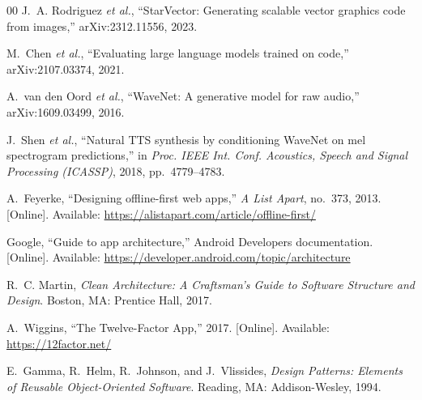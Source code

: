 \documentclass[conference]{IEEEtran}
\begin{document}
\begin{thebibliography}{00}
 J.~A. Rodriguez \emph{et al.}, ``StarVector:
Generating scalable vector graphics code from images,'' arXiv:2312.11556, 2023.

 M.~Chen \emph{et al.}, ``Evaluating large language
models trained on code,'' arXiv:2107.03374, 2021.

 A.~van den Oord \emph{et al.}, ``WaveNet: A generative
model for raw audio,'' arXiv:1609.03499, 2016.

 J.~Shen \emph{et al.}, ``Natural TTS synthesis by
conditioning WaveNet on mel spectrogram predictions,'' in \emph{Proc. IEEE Int.
Conf. Acoustics, Speech and Signal Processing (ICASSP)}, 2018, pp.~4779--4783.

 A.~Feyerke, ``Designing offline-first web apps,'' \emph{A
List Apart}, no.~373, 2013. [Online]. Available:
\url{https://alistapart.com/article/offline-first/}

 Google, ``Guide to app architecture,'' Android Developers
documentation. [Online]. Available:
\url{https://developer.android.com/topic/architecture}

 R.~C. Martin, \emph{Clean Architecture: A Craftsman's
Guide to Software Structure and Design}. Boston, MA: Prentice Hall, 2017.

 A.~Wiggins, ``The Twelve-Factor App,'' 2017. [Online].
Available: \url{https://12factor.net/}

 E.~Gamma, R.~Helm, R.~Johnson, and J.~Vlissides,
\emph{Design Patterns: Elements of Reusable Object-Oriented Software}. Reading,
MA: Addison-Wesley, 1994.

\end{thebibliography}
\end{document}
